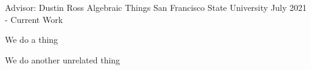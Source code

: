 \documentclass[../omelveny-cv]{subfiles}
\begin{document}

\begin{cventries}

    \cventry
    {Advisor: Dustin Ross} %
    {Algebraic Things} %
    {San Francisco State University} %
    {July 2021 - Current Work} %
    {
        \begin{cvitems} %
            \item {We do a thing}
            \item {We do another unrelated thing}
        \end{cvitems}
    }

\end{cventries}
\end{document}
